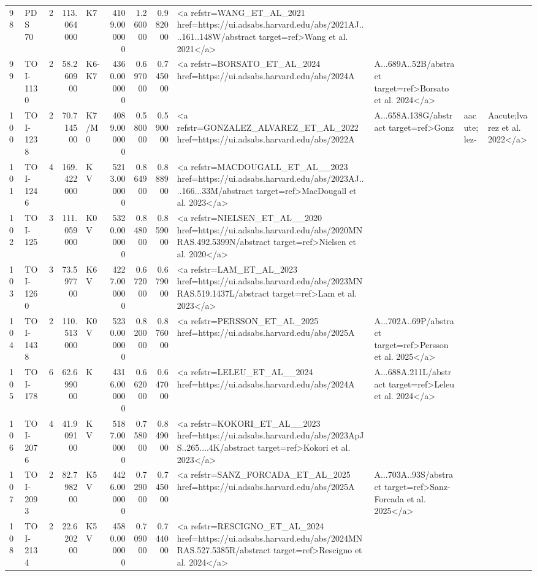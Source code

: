\begin{tabular}{llrrlrrrl}
98 & PDS 70 & 2 & 113.064000 & K7 & 4109.000000 & 1.260000 & 0.982000 & <a refstr=WANG_ET_AL_2021 href=https://ui.adsabs.harvard.edu/abs/2021AJ....161..148W/abstract target=ref>Wang et al. 2021</a> \\
99 & TOI-1130 & 2 & 58.260900 & K6-K7 & 4360.000000 & 0.697000 & 0.745000 & <a refstr=BORSATO_ET_AL_2024 href=https://ui.adsabs.harvard.edu/abs/2024A&A...689A..52B/abstract target=ref>Borsato et al. 2024</a> \\
100 & TOI-1238 & 2 & 70.714500 & K7/M0 & 4089.000000 & 0.580000 & 0.590000 & <a refstr=GONZALEZ_ALVAREZ_ET_AL_2022 href=https://ui.adsabs.harvard.edu/abs/2022A&A...658A.138G/abstract target=ref>Gonz&aacute;lez-&Aacute;lvarez et al. 2022</a> \\
101 & TOI-1246 & 4 & 169.422000 & K V & 5213.000000 & 0.864900 & 0.888900 & <a refstr=MACDOUGALL_ET_AL__2023 href=https://ui.adsabs.harvard.edu/abs/2023AJ....166...33M/abstract target=ref>MacDougall et al. 2023</a> \\
102 & TOI-125 & 3 & 111.059000 & K0 V & 5320.000000 & 0.848000 & 0.859000 & <a refstr=NIELSEN_ET_AL__2020 href=https://ui.adsabs.harvard.edu/abs/2020MNRAS.492.5399N/abstract target=ref>Nielsen et al. 2020</a> \\
103 & TOI-1260 & 3 & 73.597700 & K6 V & 4227.000000 & 0.672000 & 0.679000 & <a refstr=LAM_ET_AL_2023 href=https://ui.adsabs.harvard.edu/abs/2023MNRAS.519.1437L/abstract target=ref>Lam et al. 2023</a> \\
104 & TOI-1438 & 2 & 110.513000 & K0 V & 5230.000000 & 0.820000 & 0.876000 & <a refstr=PERSSON_ET_AL_2025 href=https://ui.adsabs.harvard.edu/abs/2025A&A...702A..69P/abstract target=ref>Persson et al. 2025</a> \\
105 & TOI-178 & 6 & 62.699000 & K & 4316.000000 & 0.662000 & 0.647000 & <a refstr=LELEU_ET_AL__2024 href=https://ui.adsabs.harvard.edu/abs/2024A&A...688A.211L/abstract target=ref>Leleu et al. 2024</a> \\
106 & TOI-2076 & 4 & 41.909100 & K V & 5187.000000 & 0.758000 & 0.849000 & <a refstr=KOKORI_ET_AL__2023 href=https://ui.adsabs.harvard.edu/abs/2023ApJS..265....4K/abstract target=ref>Kokori et al. 2023</a> \\
107 & TOI-2093 & 2 & 82.798200 & K5 V & 4426.000000 & 0.729000 & 0.745000 & <a refstr=SANZ_FORCADA_ET_AL_2025 href=https://ui.adsabs.harvard.edu/abs/2025A&A...703A..93S/abstract target=ref>Sanz-Forcada et al. 2025</a> \\
108 & TOI-2134 & 2 & 22.620200 & K5 V & 4580.000000 & 0.709000 & 0.744000 & <a refstr=RESCIGNO_ET_AL_2024 href=https://ui.adsabs.harvard.edu/abs/2024MNRAS.527.5385R/abstract target=ref>Rescigno et al. 2024</a> \\

\end{tabular}
